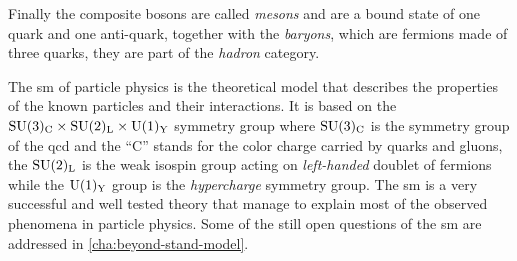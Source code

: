 Finally the composite bosons are called \emph{mesons} and are a bound state of
one quark and one anti-quark, together with the \emph{baryons}, which are
fermions made of three quarks, they are part of the \emph{hadron} category.

The \gls{sm} of particle physics is the theoretical model that describes the
properties of the known particles and their interactions. It is based on the
$\mathrm{SU}(3)_\mathrm{C} \times \mathrm{SU}(2)_\mathrm{L} \times \mathrm{U}(1)_\mathrm{Y}$ symmetry group where $\mathrm{SU}(3)_\mathrm{C}$ is the
symmetry group of the \gls{qcd} and the ``C'' stands for the color charge
carried by quarks and gluons, the $\mathrm{SU}(2)_\mathrm{L}$ is the weak isospin group acting on
\emph{left-handed} doublet of fermions while the $\mathrm{U}(1)_\mathrm{Y}$ group is the
\emph{hypercharge} symmetry group. The \gls{sm} is a very successful and well
tested theory that manage to explain most of the observed phenomena in particle
physics. Some of the still open questions of the \gls{sm} are addressed in
\cref{cha:beyond-stand-model}.



